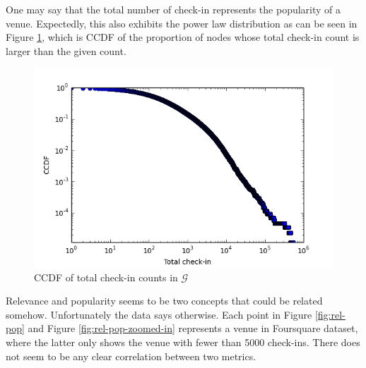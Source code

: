 One may say that the total number of check-in represents the popularity of a venue. Expectedly, this also exhibits the power law distribution as can be seen in Figure \ref{fig:checkin-distribution}, which is CCDF of the proportion of nodes whose total check-in count is larger than the given count.
\begin{figure}
\centering
\includegraphics[scale=0.5]{../checkin_new_ccdf.png}
\caption{CCDF of total check-in counts in $\mathcal{G}$}
\label{fig:checkin-distribution}
\end{figure}

Relevance and popularity seems to be two concepts that could be related somehow. Unfortunately the data says otherwise. Each point in Figure \ref{fig:rel-pop} and Figure \ref{fig:rel-pop-zoomed-in} represents a venue in Foursquare dataset, where the latter only shows the venue with fewer than 5000 check-ins. There does not seem to be any clear correlation between two metrics.


